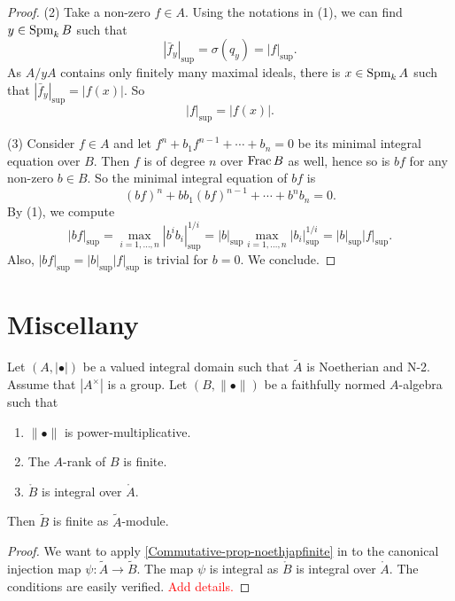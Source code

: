 \begin{proof}
    (2) Take a non-zero $f\in A$.
    Using the notations in (1),
    we can find $y\in \operatorname{Spm}_k B$ such that 
    \[
        |\bar{f}_y|_{\sup}=\sigma(q_y)=|f|_{\sup}.  
    \]
    As $A/yA$ contains only finitely many maximal ideals, there is $x\in \operatorname{Spm}_k A$ such that $|\bar{f}_y|_{\sup}=|f(x)|$. So 
    \[
        |f|_{\sup}=|f(x)|.
    \]

    (3) Consider $f\in A$ and let $f^n+b_1f^{n-1}+\cdots+b_n=0$ be its minimal integral equation over $B$. Then $f$ is of degree $n$ over $\operatorname{Frac} B$ as well, hence so is $bf$ for any non-zero $b\in B$. So the minimal integral equation of $bf$ is 
    \[
        (bf)^n+bb_1(bf)^{n-1}+\cdots+b^nb_n=0.
    \]
    By (1), we compute
    \[
        |bf|_{\sup}=\max_{i=1,\ldots,n} |b^ib_i|_{\sup}^{1/i}=|b|_{\sup}\max_{i=1,\ldots,n}|b_i|_{\sup}^{1/i}=|b|_{\sup}|f|_{\sup}.
    \]
    Also, $|bf|_{\sup}=|b|_{\sup}|f|_{\sup}$ is trivial for $b=0$. We conclude.
\end{proof}

\section{Miscellany}


\begin{lemma}\label{lma-finitemodulejapanese}
    Let $(A,|\bullet|)$ be a valued integral domain such that $\tilde{A}$ is Noetherian and N-2. Assume that $|A^{\times}|$ is a group. Let $(B,\|\bullet\|)$ be a faithfully normed $A$-algebra such that
    \begin{enumerate}
        \item $\|\bullet\|$ is power-multiplicative.
        \item The $A$-rank of $B$ is finite.
        \item $\mathring{B}$ is integral over $\mathring{A}$.
    \end{enumerate}
    Then $\tilde{B}$ is finite as $\tilde{A}$-module.
\end{lemma}
\begin{proof}
    We want to apply \cref{Commutative-prop-noethjapfinite} in  to the canonical injection map $\psi:\tilde{A}\rightarrow \tilde{B}$. The map $\psi$ is integral as $\mathring{B}$ is integral over $\mathring{A}$. The conditions are easily verified. \textcolor{red}{Add details.}
\end{proof}


\printbibliography
